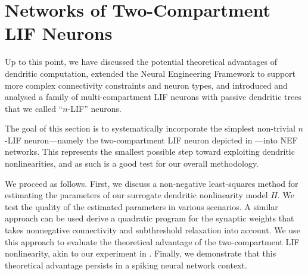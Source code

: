 \section{Networks of Two-Compartment LIF Neurons}
\label{sec:two_comp_lif}

Up to this point, we have discussed the potential theoretical advantages of dendritic computation, extended the Neural Engineering Framework to support more complex connectivity constraints and neuron types, and introduced and analysed a family of multi-compartment LIF neurons with passive dendritic trees that we called \enquote{$n$-LIF} neurons.

The goal of this section is to systematically incorporate the simplest non-trivial $n$-LIF neuron---namely the two-compartment LIF neuron depicted in ---into NEF networks.
This represents the smallest possible step toward exploiting dendritic nonlinearities, and as such is a good test for our overall methodology.

We proceed as follows.
First, we discuss a non-negative least-squares method for estimating the parameters of our surrogate dendritic nonlinearity model $H$.
We test the quality of the estimated parameters in various scenarios.
A similar approach can be used derive a quadratic program for the synaptic weights that takes nonnegative connectivity and subthreshold relaxation into account.
We use this approach to evaluate the theoretical advantage of the two-compartment LIF nonlinearity, akin to our experiment in .
Finally, we demonstrate that this theoretical advantage persists in a spiking neural network context.




